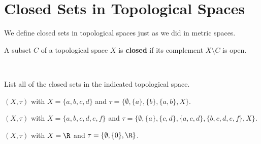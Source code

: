 \section*{Closed Sets in Topological Spaces}

We define closed sets in topological spaces just as we did in metric spaces.  



\begin{definition} A subset $C$ of a topological space $X$ is \textbf{closed} if its complement $X \setminus C$ is open. 
\end{definition}



\begin{pa}  ~
\be
\item List all of the closed sets in the indicated topological space.
	\ba
	\item $(X, \tau)$ with $X= \{a,b,c,d\}$ and $\tau = \{\emptyset, \{a\}, \{b\}, \{a,b\}, X \}$.



\begin{comment}

\solution The closed sets are the complements of the open sets, so the closed sets are 
\[X, \{b,c,d\}, \{a,c,d\}, \{c,d\}, \text{ and } \emptyset.\]



\end{comment}


	\item $(X, \tau)$ with $X= \{a,b,c,d,e,f\}$ and $\tau = \{\emptyset,\{a\}, \{c,d\}, \{a,c,d\}, \{b,c,d,e,f\}, X\}$.



\begin{comment}

\solution The closed sets are the complements of the open sets, so the closed sets are 
\[X, \{b,c,d,e,f\}, \{a,b,e,f\}, \{b,e,f\}, \{a\}, \text{ and } \emptyset.\]



\end{comment}

	\item $(X, \tau)$ with $X = \R$ and $\tau = \{\emptyset, \{0\}, \R\}$. 



\begin{comment}

\solution The closed sets are the complements of the open sets, so the closed sets are 
\[\R, \R-\{0\}, \text{ and } \emptyset.\]




\end{comment}
\end{pa}
